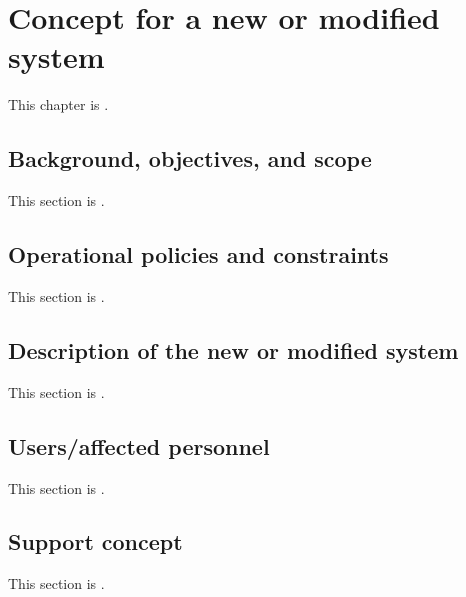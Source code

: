 
\chapter{Concept for a new or modified system}
\label{loc:Concept for a new or modified system}


This chapter is \TBD.


\section{Background, objectives, and scope}
\label{loc:Background, objectives, and scope}


This section is \TBD.


\section{Operational policies and constraints}
\label{loc:Operational policies and constraints}


This section is \TBD.


\section{Description of the new or modified system}
\label{loc:Description of the new or modified system}


This section is \TBD.


\section{Users/affected personnel}
\label{loc:Users/affected personnel}


This section is \TBD.


\section{Support concept}
\label{loc:Support concept}


This section is \TBD.

